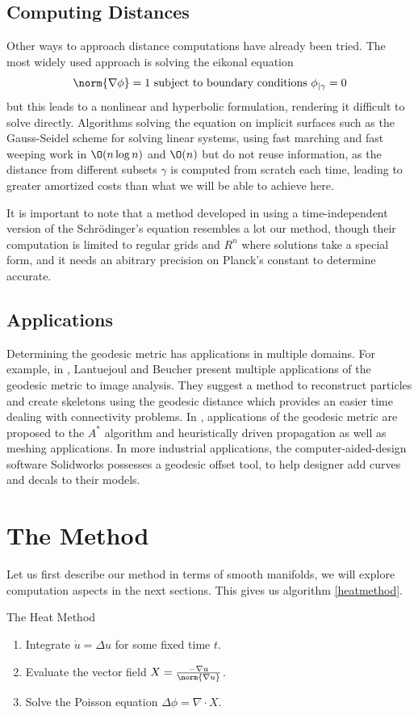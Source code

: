 \documentclass[math, info, english]{cours}
\begin{document}
\subsection{Computing Distances}
Other ways to approach distance computations have already been tried.
The most widely used approach is solving the eikonal equation
\begin{equation}
	\norm{\nabla \phi} = 1 \text{ subject to boundary conditions } \phi_{\mid \gamma} = 0
\end{equation}
but this leads to a nonlinear and hyperbolic formulation, rendering it difficult to solve directly.
Algorithms solving the equation on implicit surfaces such as the Gauss-Seidel scheme for solving linear systems,
using fast marching and fast weeping work in $\O(n\log n)$ and $\O(n)$ but do not reuse information,
as the distance from different subsets $\gamma$ is computed from scratch each time,
leading to greater amortized costs than what we will be able to achieve here.

It is important to note that a method developed in \cite{schrod} using a time-independent version of the Schrödinger's equation
resembles a lot our method, though their computation is limited to regular grids and $R^{n}$ where solutions take a
special form, and it needs an abitrary precision on Planck's constant to determine accurate.

\subsection{Applications}
Determining the geodesic metric has applications in multiple domains.
For example, in \cite{geodesicmetricuse}, Lantuejoul and Beucher present multiple applications of the geodesic metric to image analysis.
They suggest a method to reconstruct particles and create skeletons using the geodesic distance which provides an easier time dealing with connectivity problems.
In \cite{Peyré2009}, applications of the geodesic metric are proposed to the $A^{*}$ algorithm and heuristically driven propagation as well as meshing applications.
In more industrial applications, the computer-aided-design software Solidworks possesses a geodesic offset tool, to help designer add curves and decals to their models.

\section{The Method}
Let us first describe our method in terms of smooth manifolds, we will explore computation aspects in the next sections.
This gives us algorithm \ref{heatmethod}.
\begin{algorithm}
	\caption{The Heat Method}
	\label{heatmethod}
	\begin{enumerate}
		\item Integrate $\dot{u} = \Delta u$ for some fixed time $t$.
		\item Evaluate the vector field $X = \frac{-\nabla u}{\norm{\nabla u}}$.
		\item Solve the Poisson equation $\Delta \phi = \nabla \cdot X$.
	\end{enumerate}
\end{algorithm}
\end{document}
